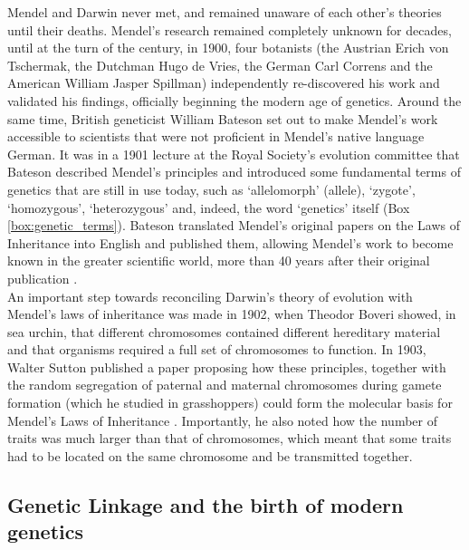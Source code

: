 Mendel and Darwin never met, and remained unaware of each other’s theories until their deaths. 
Mendel’s research remained completely unknown for decades, until at the turn of the century, in 1900, four botanists (the Austrian Erich von Tschermak, the Dutchman Hugo de Vries, the German Carl Correns and the American William Jasper Spillman) independently re-discovered his work and validated his findings, officially beginning the modern age of genetics.
Around the same time, British geneticist William Bateson set out to make Mendel’s work accessible to scientists that were not proficient in Mendel’s native language German.
It was in a 1901 lecture at the Royal Society's evolution committee that Bateson described Mendel's principles and introduced some fundamental terms of genetics that are still in use today, such as `allelomorph' (allele), `zygote', `homozygous', `heterozygous' and, indeed, the word `genetics' itself (Box \ref{box:genetic_terms}).
Bateson translated Mendel’s original papers on the Laws of Inheritance into English and published them, allowing Mendel’s work to become known in the greater scientific world, more than 40 years after their original publication \cite{bateson2013mendel}.\\ 

An important step towards reconciling Darwin’s theory of evolution with Mendel’s laws of inheritance was made in 1902, when Theodor Boveri showed, in sea urchin, that different chromosomes contained different hereditary material and that organisms required a full set of chromosomes to function. 
In 1903, Walter Sutton published a paper proposing how these principles, together with the random segregation of paternal and maternal chromosomes during gamete formation (which he studied in grasshoppers) could form the molecular basis for Mendel’s Laws of Inheritance \cite{sutton1903chromosomes}. 
Importantly, he also noted how the number of traits was much larger than that of chromosomes, which meant that some traits had to be located on the same chromosome and be transmitted together.

\subsection{Genetic Linkage and the birth of modern genetics} %
\label{sec:Morgan}

